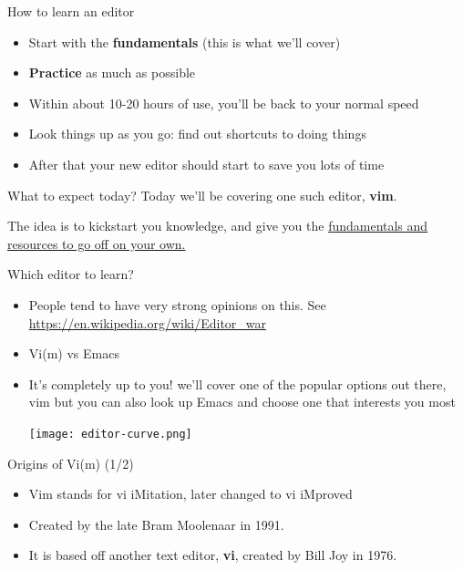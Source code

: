 \documentclass[12pt]{beamer}
\begin{document}
\begin{frame}{How to learn an editor}
    \begin{itemize}
        \item Start with the \textbf{fundamentals} (this is what we'll cover)
        \item \textbf{Practice} as much as possible
        \item Within about 10-20 hours of use, you'll be back to your normal speed
        \item Look things up as you go: find out shortcuts to doing things
        \item After that your new editor should start to save you lots of time
    \end{itemize}{}
\end{frame}{}

\begin{frame}{What to expect today?}
    Today we'll be covering one such editor, \textbf{vim}.

    The idea is to kickstart you knowledge, and give you the \underline{fundamentals and resources to go off on your own.}
\end{frame}{}

\begin{frame}{Which editor to learn?}
    \begin{itemize}
        \item People tend to have very strong opinions on this. See \url{https://en.wikipedia.org/wiki/Editor_war}
        \item Vi(m) vs Emacs
        \item It’s completely up to you! we’ll cover one of the popular options out there, vim but you can also look up Emacs and choose one that interests you most

              \begin{center}
                  \texttt{[image: editor-curve.png]}
              \end{center}{}
    \end{itemize}{}
\end{frame}{}

\begin{frame}{Origins of Vi(m) (1/2)}
    \begin{itemize}
        \item Vim stands for vi iMitation, later changed to vi iMproved
        \item Created by the late Bram Moolenaar in 1991.
        \item It is based off another text editor, \textbf{vi}, created by Bill Joy in 1976.
    \end{itemize}{}
\end{frame}{}
\end{document}
